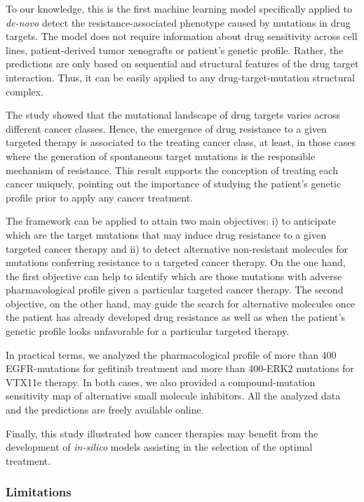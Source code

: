 \documentclass[11pt, b5paper,twoside]{tesi_upf}
\begin{document}
\par  To our knowledge, this is the first machine learning model specifically applied to \textit{de-novo} detect the resistance-associated phenotype caused by mutations in drug targets. The model does not require information about drug sensitivity across cell lines, patient-derived tumor xenografts or patient's genetic profile. Rather,  the predictions are only based on sequential and structural features of the drug target interaction. Thus, it can be easily applied to any drug-target-mutation structural complex. 
\par The study showed that the mutational landscape of drug targets varies across different cancer classes. Hence, the emergence of drug resistance to a given targeted therapy is associated to the treating cancer class, at least, in those cases where the generation of spontaneous target mutations is the responsible mechanism of resistance. This result supports the conception of treating each cancer uniquely, pointing out the importance of studying the patient's genetic profile prior to apply any cancer treatment.
\par  The framework can be applied to attain two main objectives: i) to anticipate which are the target mutations that may induce drug resistance to a given targeted cancer therapy and ii) to detect alternative non-resistant molecules for mutations conferring resistance to a targeted cancer therapy. On the one hand, the first objective can help to identify which are those mutations with adverse pharmacological profile given a particular targeted cancer therapy. The second objective, on the other hand,  may guide the search for alternative molecules once the patient has already developed drug resistance as well as when the patient's genetic profile looks unfavorable for a particular targeted therapy.  
\par  In practical terms, we analyzed the pharmacological profile of more than 400 EGFR-mutations for gefitinib treatment and more than 400-ERK2 mutations for VTX11e therapy. In both cases, we also provided a compound-mutation sensitivity map of alternative small molecule inhibitors. All the analyzed data and the predictions are freely available online. 
\par Finally, this study illustrated how cancer therapies may benefit from the development of \textit{in-silico} models assisting in the selection of the optimal treatment.   
 

\subsubsection{Limitations} 
 
\end{document}
